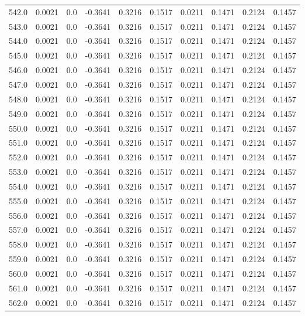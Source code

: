 \begin{longtable}{lrrrrrrrrr}
542.0 & 0.0021 & 0.0 & -0.3641 & 0.3216 & 0.1517 & 0.0211 & 0.1471 & 0.2124 & 0.1457 \\
543.0 & 0.0021 & 0.0 & -0.3641 & 0.3216 & 0.1517 & 0.0211 & 0.1471 & 0.2124 & 0.1457 \\
544.0 & 0.0021 & 0.0 & -0.3641 & 0.3216 & 0.1517 & 0.0211 & 0.1471 & 0.2124 & 0.1457 \\
545.0 & 0.0021 & 0.0 & -0.3641 & 0.3216 & 0.1517 & 0.0211 & 0.1471 & 0.2124 & 0.1457 \\
546.0 & 0.0021 & 0.0 & -0.3641 & 0.3216 & 0.1517 & 0.0211 & 0.1471 & 0.2124 & 0.1457 \\
547.0 & 0.0021 & 0.0 & -0.3641 & 0.3216 & 0.1517 & 0.0211 & 0.1471 & 0.2124 & 0.1457 \\
548.0 & 0.0021 & 0.0 & -0.3641 & 0.3216 & 0.1517 & 0.0211 & 0.1471 & 0.2124 & 0.1457 \\
549.0 & 0.0021 & 0.0 & -0.3641 & 0.3216 & 0.1517 & 0.0211 & 0.1471 & 0.2124 & 0.1457 \\
550.0 & 0.0021 & 0.0 & -0.3641 & 0.3216 & 0.1517 & 0.0211 & 0.1471 & 0.2124 & 0.1457 \\
551.0 & 0.0021 & 0.0 & -0.3641 & 0.3216 & 0.1517 & 0.0211 & 0.1471 & 0.2124 & 0.1457 \\
552.0 & 0.0021 & 0.0 & -0.3641 & 0.3216 & 0.1517 & 0.0211 & 0.1471 & 0.2124 & 0.1457 \\
553.0 & 0.0021 & 0.0 & -0.3641 & 0.3216 & 0.1517 & 0.0211 & 0.1471 & 0.2124 & 0.1457 \\
554.0 & 0.0021 & 0.0 & -0.3641 & 0.3216 & 0.1517 & 0.0211 & 0.1471 & 0.2124 & 0.1457 \\
555.0 & 0.0021 & 0.0 & -0.3641 & 0.3216 & 0.1517 & 0.0211 & 0.1471 & 0.2124 & 0.1457 \\
556.0 & 0.0021 & 0.0 & -0.3641 & 0.3216 & 0.1517 & 0.0211 & 0.1471 & 0.2124 & 0.1457 \\
557.0 & 0.0021 & 0.0 & -0.3641 & 0.3216 & 0.1517 & 0.0211 & 0.1471 & 0.2124 & 0.1457 \\
558.0 & 0.0021 & 0.0 & -0.3641 & 0.3216 & 0.1517 & 0.0211 & 0.1471 & 0.2124 & 0.1457 \\
559.0 & 0.0021 & 0.0 & -0.3641 & 0.3216 & 0.1517 & 0.0211 & 0.1471 & 0.2124 & 0.1457 \\
560.0 & 0.0021 & 0.0 & -0.3641 & 0.3216 & 0.1517 & 0.0211 & 0.1471 & 0.2124 & 0.1457 \\
561.0 & 0.0021 & 0.0 & -0.3641 & 0.3216 & 0.1517 & 0.0211 & 0.1471 & 0.2124 & 0.1457 \\
562.0 & 0.0021 & 0.0 & -0.3641 & 0.3216 & 0.1517 & 0.0211 & 0.1471 & 0.2124 & 0.1457 \\

\end{longtable}
